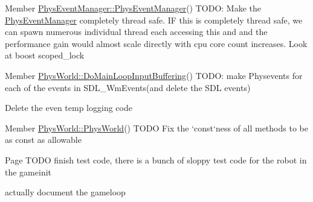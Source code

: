 \label{todo__todo000003}
\hypertarget{todo__todo000003}{}
 
\begin{DoxyDescription}
\item[Member \hyperlink{classPhysEventManager_a217e7f6006aaf5e08e2872fa4d66e5e2}{PhysEventManager::PhysEventManager}() ]TODO: Make the \hyperlink{classPhysEventManager}{PhysEventManager} completely thread safe. IF this is completely thread safe, we can spawn numerous individual thread each accessing this and and the performance gain would almost scale directly with cpu core count increases. Look at boost scoped\_\-lock 
\end{DoxyDescription}

\label{todo__todo000013}
\hypertarget{todo__todo000013}{}
 
\begin{DoxyDescription}
\item[Member \hyperlink{classPhysWorld_a81b3f0dcc0a90d039623f696343e6e9c}{PhysWorld::DoMainLoopInputBuffering}() ]TODO: make Physevents for each of the events in SDL\_\-WmEvents(and delete the SDL events) 

Delete the even temp logging code 
\end{DoxyDescription}

\label{todo__todo000005}
\hypertarget{todo__todo000005}{}
 
\begin{DoxyDescription}
\item[Member \hyperlink{classPhysWorld_a6ded8026b0cd72e7877830698197adf0}{PhysWorld::PhysWorld}() ]TODO Fix the `const`ness of all methods to be as const as allowable 
\end{DoxyDescription}

\label{todo__todo000010}
\hypertarget{todo__todo000010}{}
 
\begin{DoxyDescription}
\item[Page \hyperlink{MainLoop}{} ]TODO finish test code, there is a bunch of sloppy test code for the robot in the gameinit 

actually document the gameloop 
\end{DoxyDescription}